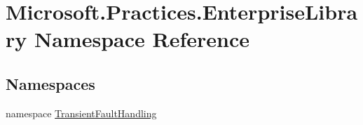 \hypertarget{namespaceMicrosoft_1_1Practices_1_1EnterpriseLibrary}{}\section{Microsoft.\+Practices.\+Enterprise\+Library Namespace Reference}
\label{namespaceMicrosoft_1_1Practices_1_1EnterpriseLibrary}
\subsection*{Namespaces}
\begin{DoxyCompactItemize}
\item 
namespace \hyperlink{namespaceMicrosoft_1_1Practices_1_1EnterpriseLibrary_1_1TransientFaultHandling}{Transient\+Fault\+Handling}
\end{DoxyCompactItemize}
